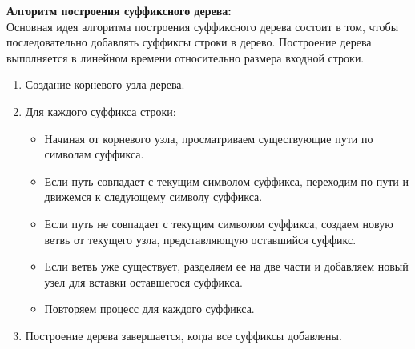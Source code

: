 \textbf{Алгоритм построения суффиксного дерева:}\\
Основная идея алгоритма построения суффиксного дерева состоит в том, чтобы последовательно добавлять суффиксы строки в дерево. Построение дерева выполняется в линейном времени относительно размера входной строки.\\

\begin{enumerate}
    \item Создание корневого узла дерева.

    \item Для каждого суффикса строки:
        \begin{itemize}
            \item Начиная от корневого узла, просматриваем существующие пути по символам суффикса.
            \item Если путь совпадает с текущим символом суффикса, переходим по пути и движемся к следующему символу суффикса.
            \item Если путь не совпадает с текущим символом суффикса, создаем новую ветвь от текущего узла, представляющую оставшийся суффикс.
            \item Если ветвь уже существует, разделяем ее на две части и добавляем новый узел для вставки оставшегося суффикса.
            \item Повторяем процесс для каждого суффикса.
        \end{itemize}
    \item Построение дерева завершается, когда все суффиксы добавлены.
\end{enumerate}

